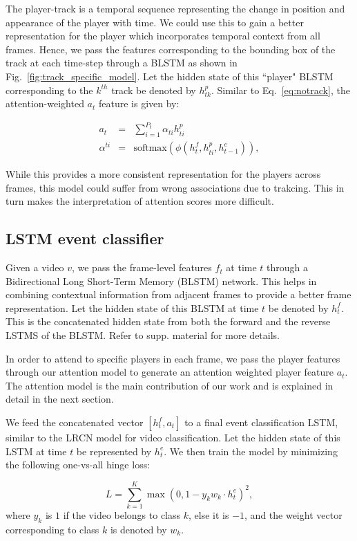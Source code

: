 {The player-track is a temporal sequence representing the change in position and
appearance of the player with time.  We could use this to gain a better
representation for the player which incorporates temporal context from all
frames. Hence, we pass the features corresponding to the bounding box of the
track at each time-step through a BLSTM as shown in
Fig.~\ref{fig:track_specific_model}. Let the hidden state of this ``player"
BLSTM corresponding to the $k^{th}$ track be denoted by $h^p_{tk}$. Similar to
Eq.~\ref{eq:notrack}, the attention-weighted $a_t$ feature is given by:

\begin{eqnarray}
  a_t & = & \sum_{i=1}^{P_t} \alpha_{ti} h^p_{ti} \\ \nonumber
  \alpha^{ti} & = & \text{softmax} \left(\phi\left(h^f_t, h^p_{ti}, h^e_{t-1}\right)\right),
\end{eqnarray}

While this provides a more consistent representation for the players across frames,
this model could suffer from wrong associations due to trakcing. This in turn makes
the interpretation of attention scores more difficult.


\subsection{LSTM event classifier}
Given a video $v$, we pass the frame-level features $f_t$ at time $t$ through a
Bidirectional Long Short-Term Memory (BLSTM) network. This helps in combining
contextual information from adjacent frames to provide a better frame
representation.  Let the hidden state of this BLSTM at time $t$ be denoted by
$h^f_t$.  This is the concatenated hidden state from both the forward and the
reverse LSTMS of the BLSTM. Refer to supp.  material for more details.

In order to attend to specific players in each frame, we pass the player features
through our attention model to generate an attention weighted player feature
$a_t$. The attention model is the main contribution of our work
and is explained in detail in the next section.

We feed the concatenated vector $[h^f_t, a_t]$ to a final event classification
LSTM, similar to the LRCN \cite{} model for video classification. Let
the hidden state of this LSTM at time $t$ be represented by $h^e_t$.  We then
train the model by minimizing the following one-vs-all hinge loss:

\begin{equation}
  L = \sum_{k = 1}^K \max (0, 1 - y_k w_k \cdot h^e_t)^2,
\end{equation} where $y_k$ is $1$ if the video belongs to class $k$,
else it is $-1$, and the weight vector corresponding to
class $k$ is denoted by $w_k$.
}